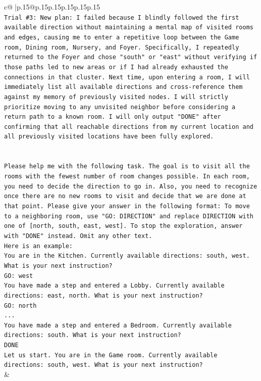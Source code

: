 \documentclass{article}
\begin{document}
{\begin{supertabular}{c@{$\;$}|p{.15\linewidth}@{}p{.15\linewidth}p{.15\linewidth}p{.15\linewidth}p{.15\linewidth}p{.15\linewidth}}
{{{\\ 
\texttt{Trial \#3: New plan: I failed because I blindly followed the first available direction without maintaining a mental map of visited rooms and edges, causing me to enter a repetitive loop between the Game room, Dining room, Nursery, and Foyer. Specifically, I repeatedly returned to the Foyer and chose "south" or "east" without verifying if those paths led to new areas or if I had already exhausted the connections in that cluster. Next time, upon entering a room, I will immediately list all available directions and cross{-}reference them against my memory of previously visited nodes. I will strictly prioritize moving to any unvisited neighbor before considering a return path to a known room. I will only output "DONE" after confirming that all reachable directions from my current location and all previously visited locations have been fully explored.} \\
\\ 
\\ 
\texttt{Please help me with the following task. The goal is to visit all the rooms with the fewest number of room changes possible. In each room, you need to decide the direction to go in. Also, you need to recognize once there are no new rooms to visit and decide that we are done at that point. Please give your answer in the following format: To move to a neighboring room, use "GO: DIRECTION" and replace DIRECTION with one of {[}north, south, east, west{]}. To stop the exploration, answer with "DONE" instead. Omit any other text.} \\
\texttt{Here is an example:} \\
\texttt{You are in the Kitchen. Currently available directions: south, west. What is your next instruction?} \\
\texttt{GO: west} \\
\texttt{You have made a step and entered a Lobby. Currently available directions: east, north. What is your next instruction?} \\
\texttt{GO: north} \\
\texttt{...} \\
\texttt{You have made a step and entered a Bedroom. Currently available directions: south. What is your next instruction?} \\
\texttt{DONE} \\
\texttt{Let us start. You are in the Game room. Currently available directions: south, west. What is your next instruction?} \\
            }
        }
    }
    & \\ \\


\end{supertabular}}
\end{document}
